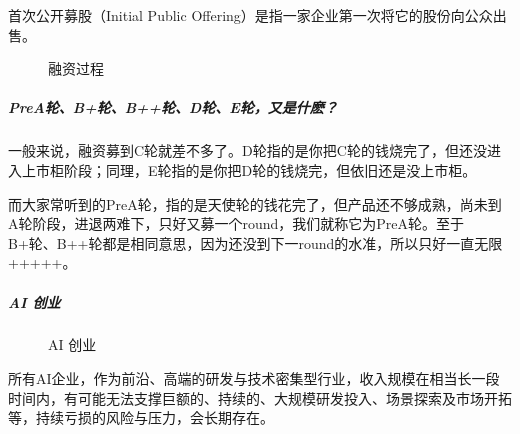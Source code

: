 \documentclass[letterpaper,11pt,english]{sphinxmanual}
\begin{document}
首次公开募股（Initial Public
Offering）是指一家企业第一次将它的股份向公众出售。

\begin{figure}[H]
\centering
\capstart

\noindent{}
\caption{融资过程\sphinxfootnotemark[120]}\label{\detokenize{chapter_introduction/money:id28}}\end{figure}
%
\begin{footnotetext}[120]\sphinxAtStartFootnote
{}
%
\end{footnotetext}\ignorespaces 

\subparagraph{Pre\sphinxhyphen{}A轮、B+轮、B++轮、D轮、E轮，又是什麽？}
\label{\detokenize{chapter_introduction/money:pre-ab-b-de}}
一般来说，融资募到C轮就差不多了。D轮指的是你把C轮的钱烧完了，但还没进入上市柜阶段；同理，E轮指的是你把D轮的钱烧完，但依旧还是没上市柜。

而大家常听到的Pre\sphinxhyphen{}A轮，指的是天使轮的钱花完了，但产品还不够成熟，尚未到A轮阶段，进退两难下，只好又募一个round，我们就称它为Pre\sphinxhyphen{}A轮。至于B+轮、B++轮都是相同意思，因为还没到下一round的水准，所以只好一直无限+++++。


\subparagraph{AI 创业}
\label{\detokenize{chapter_introduction/money:ai}}
\begin{figure}[H]
\centering
\capstart

\noindent{}
\caption{AI 创业}\label{\detokenize{chapter_introduction/money:id29}}\end{figure}

所有AI企业，作为前沿、高端的研发与技术密集型行业，收入规模在相当长一段时间内，有可能无法支撑巨额的、持续的、大规模研发投入、场景探索及市场开拓等，持续亏损的风险与压力，会长期存在。%
\begin{footnote}[121]\sphinxAtStartFootnote
{}
%
\end{footnote}
\end{document}
